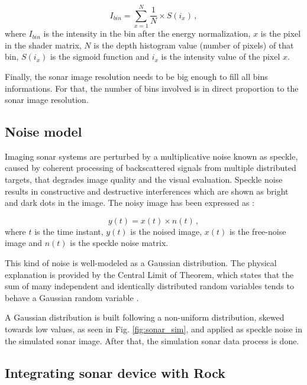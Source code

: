 \documentclass[final,5p,times]{elsarticle}
\begin{document}
\begin{equation}
    \label{eq:1}
    I_{bin} = \sum\limits_{x=1}^N \frac{1}{N} \times S(i_{x}) \, ,
\end{equation}
where $I_{bin}$ is the intensity in the bin after the energy normalization, $x$ is the pixel in the shader matrix, $N$ is the depth histogram value (number of pixels) of that bin, $S(i_{x})$ is the sigmoid function and $i_{x}$ is the intensity value of the pixel $x$.

Finally, the sonar image resolution needs to be big enough to fill all bins informations. For that, the number of bins involved is in direct proportion to the sonar image resolution.


\subsection{Noise model}
\label{dev:noise}

Imaging sonar systems are perturbed by a multiplicative noise known as speckle, caused by coherent processing of backscattered signals from multiple distributed targets, that degrades image quality and the visual evaluation. Speckle noise results in constructive and destructive interferences which are shown as bright and dark dots in the image. The noisy image has been expressed as \cite{lee1980}:

\begin{equation}
\label{eq:2}
y(t) = x(t) \times n(t) \, ,
\end{equation}
where $t$ is the time instant, $y(t)$ is the noised image, $x(t)$ is the free-noise image and $n(t)$ is the speckle noise matrix.

This kind of noise is well-modeled as a Gaussian distribution. The physical explanation is provided by the Central Limit of Theorem, which states that the sum of many independent and identically distributed random variables tends to behave a Gaussian random variable \cite{papoulis2002}.

A Gaussian distribution is built following a non-uniform distribution, skewed towards low values, as seen in Fig. \ref{fig:sonar_sim}, and applied as speckle noise in the simulated sonar image. After that, the simulation sonar data process is done.

\subsection{Integrating sonar device with Rock}
\label{dev:rock}
\end{document}
